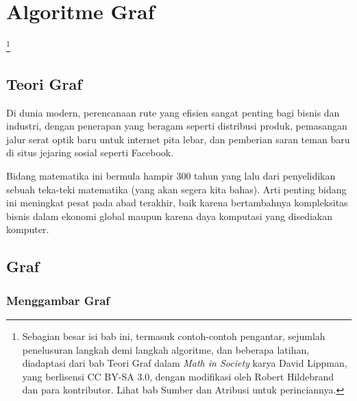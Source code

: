 %
\chapter{Algoritme Graf}\footnote{Sebagian besar isi bab ini, termasuk contoh-contoh pengantar, sejumlah penelusuran langkah demi langkah algoritme, dan beberapa latihan, diadaptasi dari bab Teori Graf dalam \emph{Math in Society} karya David Lippman, yang berlisensi CC BY-SA 3.0, dengan modifikasi oleh Robert Hildebrand dan para kontributor. Lihat bab Sumber dan Atribusi untuk perinciannya.}

\section{Teori Graf}
Di dunia modern, perencanaan rute yang efisien sangat penting bagi bisnis dan industri, dengan penerapan yang beragam seperti distribusi produk, pemasangan jalur serat optik baru untuk internet pita lebar, dan pemberian saran teman baru di situs jejaring sosial seperti Facebook.

Bidang matematika ini bermula hampir 300 tahun yang lalu dari penyelidikan sebuah teka-teki matematika (yang akan segera kita bahas).  Arti penting bidang ini meningkat pesat pada abad terakhir, baik karena bertambahnya kompleksitas bisnis dalam ekonomi global maupun karena daya komputasi yang disediakan komputer.  
\section{Graf}
\subsection{Menggambar Graf}

